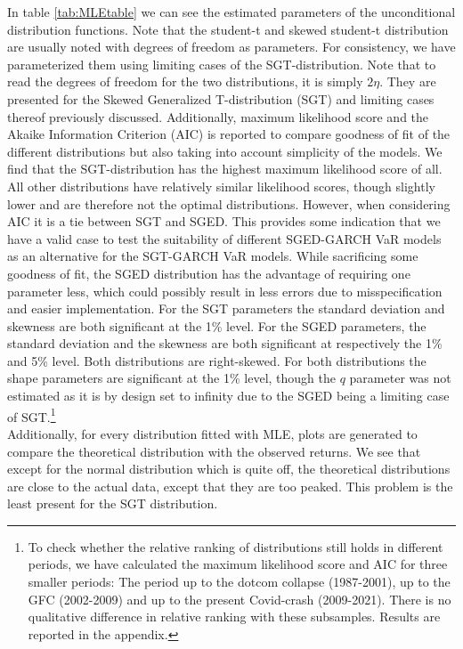 \documentclass[a4paper, twoside]{templates/ociamthesis}
\begin{document}
In table \ref{tab:MLEtable} we can see the estimated parameters of the unconditional distribution functions. Note that the student-t and skewed student-t distribution are usually noted with degrees of freedom as parameters. For consistency, we have parameterized them using limiting cases of the SGT-distribution. Note that to read the degrees of freedom for the two distributions, it is simply \(2\eta\). They are presented for the Skewed Generalized T-distribution (SGT) and limiting cases thereof previously discussed. Additionally, maximum likelihood score and the Akaike Information Criterion (AIC) is reported to compare goodness of fit of the different distributions but also taking into account simplicity of the models. We find that the SGT-distribution has the highest maximum likelihood score of all. All other distributions have relatively similar likelihood scores, though slightly lower and are therefore not the optimal distributions. However, when considering AIC it is a tie between SGT and SGED. This provides some indication that we have a valid case to test the suitability of different SGED-GARCH VaR models as an alternative for the SGT-GARCH VaR models. While sacrificing some goodness of fit, the SGED distribution has the advantage of requiring one parameter less, which could possibly result in less errors due to misspecification and easier implementation. For the SGT parameters the standard deviation and skewness are both significant at the 1\% level. For the SGED parameters, the standard deviation and the skewness are both significant at respectively the 1\% and 5\% level. Both distributions are right-skewed. For both distributions the shape parameters are significant at the 1\% level, though the \(q\) parameter was not estimated as it is by design set to infinity due to the SGED being a limiting case of SGT.\footnote{To check whether the relative ranking of distributions still holds in different periods, we have calculated the maximum likelihood score and AIC for three smaller periods: The period up to the dotcom collapse (1987-2001), up to the GFC (2002-2009) and up to the present Covid-crash (2009-2021). There is no qualitative difference in relative ranking with these subsamples. Results are reported in the appendix.} ~\\

\noindent Additionally, for every distribution fitted with MLE, plots are generated to compare the theoretical distribution with the observed returns. We see that except for the normal distribution which is quite off, the theoretical distributions are close to the actual data, except that they are too peaked. This problem is the least present for the SGT distribution.
\end{document}
